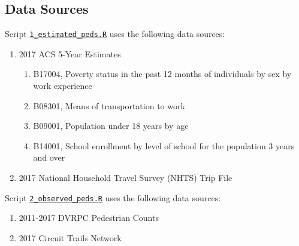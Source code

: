 \documentclass[paper=letterpaper, fontsize=11pt]{scrartcl}
\begin{document}
\subsection{Data Sources}
Script \href{https://github.com/addisonlarson/ped_counts/blob/master/1_estimated_peds.R}{\texttt{1\_estimated\_peds.R}} uses the following data sources:
\begin{enumerate}[itemsep=-4pt]
	\item 2017 ACS 5-Year Estimates
	\begin{enumerate}[itemsep=-4pt]
		\item B17004, Poverty status in the past 12 months of individuals by sex by work experience
		\item B08301, Means of transportation to work
		\item B09001, Population under 18 years by age
		\item B14001, School enrollment by level of school for the population 3 years and over
	\end{enumerate}
	\item 2017 National Household Travel Survey (NHTS) Trip File
\end{enumerate}

Script \href{https://github.com/addisonlarson/ped_counts/blob/master/2_observed_peds.R}{\texttt{2\_observed\_peds.R}} uses the following data sources:
\begin{enumerate}[itemsep=-4pt]
	\item 2011-2017 DVRPC Pedestrian Counts
	\item 2017 Circuit Trails Network
\end{enumerate}
\end{document}
